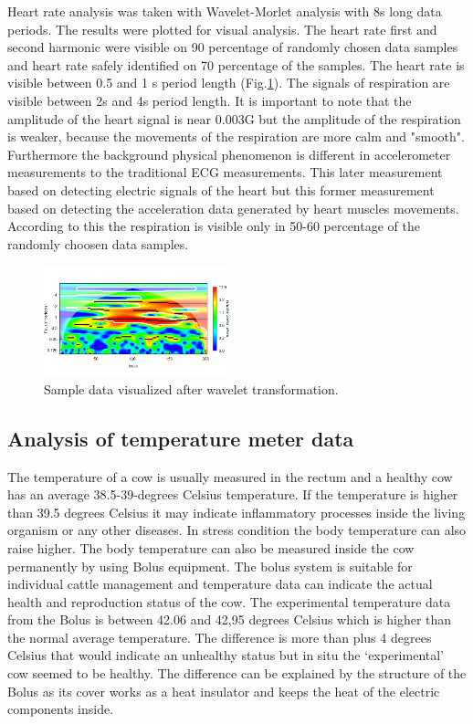 \documentclass[conference]{IEEEtran}
\begin{document}
Heart rate analysis was taken with Wavelet-Morlet analysis with 8s long data
periods. The results were plotted for visual analysis. The heart rate first and
second harmonic were visible on 90 percentage of randomly chosen data samples
and heart rate safely identified on 70 percentage of the samples. The heart
rate is visible between 0.5 and 1 s period length (Fig.\ref{heart-wavelet}).
The signals of respiration are visible between 2s and 4s period length. It is
important to note that the amplitude of the heart signal is near 0.003G but the
amplitude of the respiration is weaker, because the movements of the
respiration are more calm and "smooth". Furthermore the background physical
phenomenon is different in accelerometer measurements to the traditional ECG
measurements. This later measurement based on detecting electric signals of the
heart but this former measurement based on detecting the acceleration data
generated by heart muscles movements.   According to this the respiration is
visible only in 50-60 percentage of the randomly choosen data samples.

\begin{figure}[htbp]
\centerline{\includegraphics[width=0.48\textwidth]{fig/Wavelet.png}}
  \caption{Sample data visualized after wavelet transformation.}
\label{heart-wavelet}
\end{figure}

\subsection{Analysis of temperature meter data}

The temperature of a cow is usually measured in the rectum and a healthy cow has an average 38.5-39-degrees Celsius temperature. If the temperature is higher than 39.5 degrees Celsius it may indicate inflammatory processes inside the living organism or any other diseases. In stress condition the body temperature can also raise higher. The body temperature can also be measured inside the cow permanently by using Bolus equipment. The bolus system is suitable for individual cattle management and temperature data can indicate the actual health and reproduction status of the cow.
The experimental temperature data from the Bolus is between 42.06 and 42,95 degrees Celsius which is higher than the normal average temperature. The difference is more than plus 4 degrees Celsius that would indicate an unhealthy status but in situ the ‘experimental’ cow seemed to be healthy. The difference can be explained by the structure of the Bolus as its cover works as a heat insulator and keeps the heat of the electric components inside.
\end{document}
